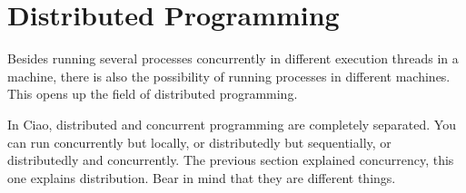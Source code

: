 
\section{Distributed Programming}

Besides running several processes concurrently in different execution
threads in a machine, there is also the possibility of running
processes in different machines. This opens up the field of
distributed programming. 

In Ciao, distributed and concurrent programming are completely
separated. You can run concurrently but locally, or distributedly but
sequentially, or distributedly and concurrently. The previous section
explained concurrency, this one explains distribution. Bear in mind
that they are different things.
